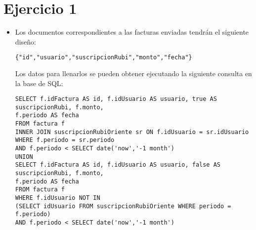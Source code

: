 \section{Ejercicio 1}
\begin{itemize}
\item Los documentos correspondientes a las facturas enviadas tendr\'an el siguiente dise\~no:
\begin{verbatim}
{"id","usuario","suscripcionRubi","monto","fecha"}
\end{verbatim}
Los datos para llenarlos se pueden obtener ejecutando la siguiente consulta en la base de SQL:
\begin{verbatim}
SELECT f.idFactura AS id, f.idUsuario AS usuario, true AS suscripcionRubi, f.monto, 
f.periodo AS fecha
FROM factura f 
INNER JOIN suscripcionRubiOriente sr ON f.idUsuario = sr.idUsuario
WHERE f.periodo = sr.periodo 
AND f.periodo < SELECT date('now','-1 month')
UNION 
SELECT f.idFactura AS id, f.idUsuario AS usuario, false AS suscripcionRubi, f.monto, 
f.periodo AS fecha
FROM factura f
WHERE f.idUsuario NOT IN 
(SELECT idUsuario FROM suscripcionRubiOriente WHERE periodo = f.periodo)
AND f.periodo < SELECT date('now','-1 month')
\end{verbatim}


\end{itemize}
